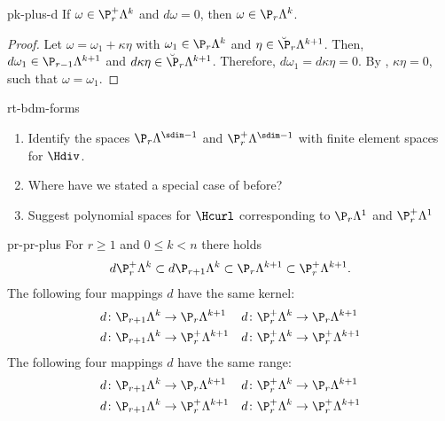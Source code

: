 \begin{Lemma}{pk-plus-d}
  If $\omega\in \P_r^+\Lambda^k$ and $d\omega=0$, then
  $\omega\in\P_r\Lambda^k$.
\end{Lemma}

\begin{proof}
  Let $\omega = \omega_1 + \kappa\eta$ with $\omega_1\in\P_r\Lambda^k$
  and $\eta\in \breve\P_r\Lambda^{k+1}$. Then,
  $d\omega_1\in\P_{r-1}\Lambda^{k+1}$ and
  $d\kappa\eta\in \breve\P_r\Lambda^{k+1}$. Therefore,
  $d\omega_1 = d\kappa\eta = 0$. By
  , $\kappa\eta=0$, such that
  $\omega=\omega_1$.
\end{proof}

\begin{Problem}{rt-bdm-forms}
  \begin{enumerate}
  \item   Identify the spaces $\P_r \Lambda^{\sdim-1}$ and
    $\P_r^+ \Lambda^{\sdim-1}$ with finite element spaces for
    $\Hdiv$.
  \item Where have we stated a special case of
     before?
  \item Suggest polynomial spaces for $\Hcurl$ corresponding to
    $\P_r \Lambda^{1}$ and $\P_r^+ \Lambda^{1}$
  \end{enumerate}
\end{Problem}

\begin{Lemma}{pr-pr-plus}
  For $r\ge 1$ and $0\le k < n$ there holds
  \begin{gather}
    d\P_{r}^+\Lambda^k \subset d\P_{r+1}\Lambda^k
    \subset \P_r\Lambda^{k+1}
    \subset \P_r^+\Lambda^{k+1}.
  \end{gather}
  The following four mappings $d$ have the same kernel:
  \begin{gather}
    \begin{aligned}
      d\colon \P_{r+1}\Lambda^k &\to \P_{r}\Lambda^{k+1}
      &
      d\colon \P_r^+\Lambda^k &\to \P_{r}\Lambda^{k+1}
      \\
      d\colon \P_{r+1}\Lambda^k &\to \P_{r}^+\Lambda^{k+1}
      &
      d\colon \P_r^+\Lambda^k &\to \P_{r}^+\Lambda^{k+1}
    \end{aligned}
  \end{gather}
  The following four mappings $d$ have the same range:
  \begin{gather}
    \begin{aligned}
      d\colon \P_{r+1}\Lambda^k &\to \P_{r}\Lambda^{k+1}
      &
      d\colon \P_{r}^+\Lambda^k &\to \P_{r}\Lambda^{k+1}
      \\
      d\colon \P_{r+1}\Lambda^k &\to \P_{r}^+\Lambda^{k+1}
      &
      d\colon \P_{r}^+\Lambda^k &\to \P_{r}^+\Lambda^{k+1}
    \end{aligned}
  \end{gather}
\end{Lemma}


